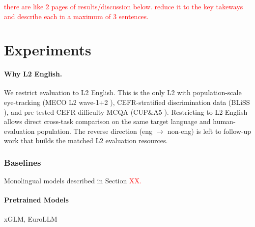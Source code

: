 \documentclass[11pt]{article}
\begin{document}
\textcolor{red}{there are like 2 pages of results/discussion below. reduce it to the key takeways and describe each in a maximum of 3 sentences. }


\clearpage

\section{Experiments}\label{sec:experiments}



\paragraph{Why L2 English.} We restrict evaluation to L2 English. This is the only L2 with population-scale eye-tracking (MECO L2 wave-1+2 \citealp{kuperman2023text, kuperman2025new}), CEFR-stratified discrimination data (BLiSS \citealp{gao2025bliss}), and pre-tested CEFR difficulty MCQA (CUP\&A5 \citealp{mullooly2023cupa5}). Restricting to L2 English allows direct cross-task comparison on the same target language and human-evaluation population. The reverse direction (eng $\to$ non-eng) is left to follow-up work that builds the matched L2 evaluation resources.

\subsubsection{Baselines}
Monolingual models described in Section \textcolor{red}{XX.}

\paragraph{Pretrained Models} xGLM, EuroLLM 


\end{document}

